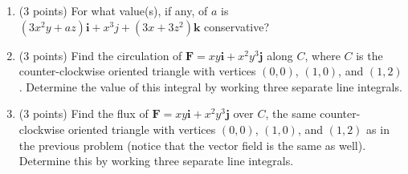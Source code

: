 \documentclass[11pt]{article}
\newenvironment{solution}
  {\textit{Solution.}}
\newcommand{\sol}[1]{
    \begin{customframedproof}[linecolor=orangehdx!75,]
        \begin{solution}
        #1
        \end{solution}
    \end{customframedproof}
}
\newcommand{\mb}[1]{\mathbf{#1}}
\newcommand{\mbi}{\mathbf{i}}
\newcommand{\mbj}{\mathbf{j}}
\newcommand{\mbk}{\mathbf{k}}
\begin{document}
\begin{enumerate}
    \sol{
        
    }

    \item (3 points) For what value(s), if any, of \(a\) is \((3x^{2}y + az)\mbi + x^{3}j + (3x + 3z^{2})\mbk\) conservative?  

    \sol{
        
    }

    \item (3 points) Find the circulation of \(\mb{F} = xy\mbi + x^{2}y^{3}\mbj\) along \(C\), where \(C\) is the counter-clockwise oriented triangle with vertices \((0,0)\), \((1,0)\), and \((1,2)\). Determine the value of this integral by working three separate line integrals.

    \sol{
        
    }

    \item (3 points) Find the flux of \(\mb{F} = xy\mbi + x^{2}y^{3}\mbj\) over \(C\), the same counter-clockwise oriented triangle with vertices \((0,0)\), \((1,0)\), and \((1,2)\) as in the previous problem (notice that the vector field is the same as well). Determine this by working three separate line integrals.  

    \sol{
        
    }
\end{enumerate}
\end{document}
